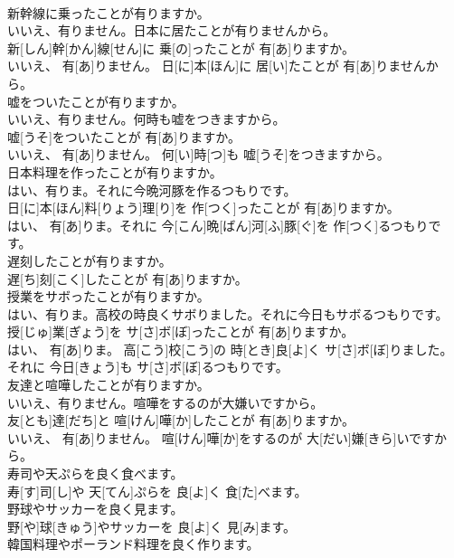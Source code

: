 \documentclass[8pt]{extreport}
\begin{document}
\begin{CJK}{UTF8}{min}
\\	新幹線に乗ったことが有りますか。 
\\	いいえ、有りません。日本に居たことが有りませんから。	
\\	新[しん]幹[かん]線[せん]に 乗[の]ったことが 有[あ]りますか。 
\\	いいえ、 有[あ]りません。 日[に]本[ほん]に 居[い]たことが 有[あ]りませんから。
\\	嘘をついたことが有りますか。 
\\	いいえ、有りません。何時も嘘をつきますから。	
\\	嘘[うそ]をついたことが 有[あ]りますか。 
\\	いいえ、 有[あ]りません。 何[い]時[つ]も 嘘[うそ]をつきますから。
\\	日本料理を作ったことが有りますか。 
\\	はい、有りま。それに今晩河豚を作るつもりです。	
\\	日[に]本[ほん]料[りょう]理[り]を 作[つく]ったことが 有[あ]りますか。 
\\	はい、 有[あ]りま。それに 今[こん]晩[ばん]河[ふ]豚[ぐ]を 作[つく]るつもりです。
\\	遅刻したことが有りますか。	
\\	遅[ち]刻[こく]したことが 有[あ]りますか。
\\	授業をサボったことが有りますか。 
\\	はい、有りま。高校の時良くサボりました。それに今日もサボるつもりです。	
\\	授[じゅ]業[ぎょう]を サ[さ]ボ[ぼ]ったことが 有[あ]りますか。 
\\	はい、 有[あ]りま。 高[こう]校[こう]の 時[とき]良[よ]く サ[さ]ボ[ぼ]りました。それに 今日[きょう]も サ[さ]ボ[ぼ]るつもりです。
\\	友達と喧嘩したことが有りますか。 
\\	いいえ、有りません。喧嘩をするのが大嫌いですから。	
\\	友[とも]達[だち]と 喧[けん]嘩[か]したことが 有[あ]りますか。 
\\	いいえ、 有[あ]りません。 喧[けん]嘩[か]をするのが 大[だい]嫌[きら]いですから。
\\	寿司や天ぷらを良く食べます。	
\\	寿[す]司[し]や 天[てん]ぷらを 良[よ]く 食[た]べます。
\\	野球やサッカーを良く見ます。	
\\	野[や]球[きゅう]やサッカーを 良[よ]く 見[み]ます。
\\	韓国料理やポーランド料理を良く作ります。	

\end{CJK}
\end{document}
